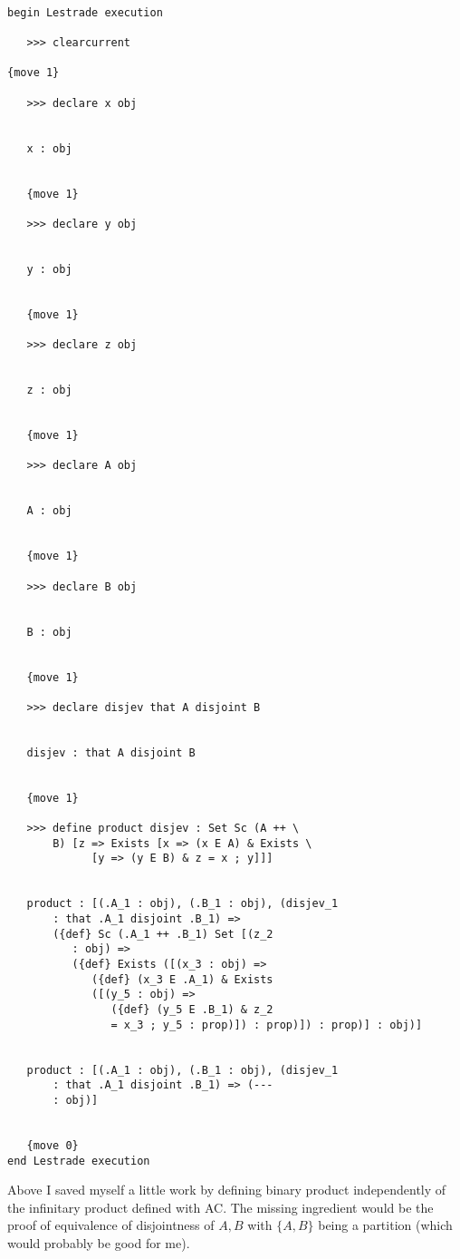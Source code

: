 \documentclass[12pt]{article}
\begin{document}
\begin{verbatim}

begin Lestrade execution

   >>> clearcurrent

{move 1}

   >>> declare x obj


   x : obj


   {move 1}

   >>> declare y obj


   y : obj


   {move 1}

   >>> declare z obj


   z : obj


   {move 1}

   >>> declare A obj


   A : obj


   {move 1}

   >>> declare B obj


   B : obj


   {move 1}

   >>> declare disjev that A disjoint B


   disjev : that A disjoint B


   {move 1}

   >>> define product disjev : Set Sc (A ++ \
       B) [z => Exists [x => (x E A) & Exists \
             [y => (y E B) & z = x ; y]]]


   product : [(.A_1 : obj), (.B_1 : obj), (disjev_1 
       : that .A_1 disjoint .B_1) => 
       ({def} Sc (.A_1 ++ .B_1) Set [(z_2 
          : obj) => 
          ({def} Exists ([(x_3 : obj) => 
             ({def} (x_3 E .A_1) & Exists 
             ([(y_5 : obj) => 
                ({def} (y_5 E .B_1) & z_2 
                = x_3 ; y_5 : prop)]) : prop)]) : prop)] : obj)]


   product : [(.A_1 : obj), (.B_1 : obj), (disjev_1 
       : that .A_1 disjoint .B_1) => (--- 
       : obj)]


   {move 0}
end Lestrade execution
\end{verbatim}

Above I saved myself a little work by defining binary product independently of the infinitary product defined with AC.  The missing ingredient would be the proof of equivalence
of disjointness of $A,B$ with $\{A,B\}$ being a partition (which would probably be good for me).
\end{document}
